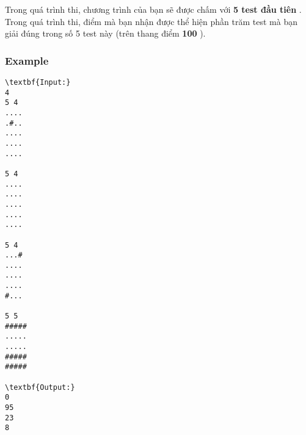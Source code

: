    Trong quá trình thi, chương trình của bạn sẽ được chấm với   \textbf{    5 test đầu tiên   }   . Trong quá trình thi, điểm mà bạn nhận được thể hiện phần trăm test mà bạn giải đúng trong số 5 test này (trên thang điểm   \textbf{    100   }   ).  

\subsubsection{   Example  }
\begin{verbatim}
\textbf{Input:}
4
5 4
....
.#..
....
....
....

5 4
....
....
....
....
....

5 4
...#
....
....
....
#...

5 5
#####
.....
.....
#####
#####

\textbf{Output:}
0
95
23
8
\end{verbatim}
